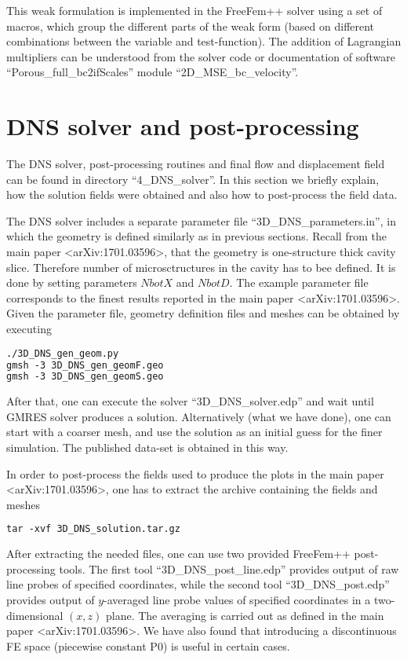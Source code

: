 \documentclass[12pt,a4paper]{article}
\begin{document}
This weak formulation is implemented in the FreeFem++ solver using a set of macros, which group the different parts of the weak form (based on different combinations between the variable and test-function). The addition of Lagrangian multipliers can be understood from the solver code or documentation of software ``Porous\_full\_bc2ifScales'' module ``2D\_MSE\_bc\_velocity''.


\section{DNS solver and post-processing}

The DNS solver, post-processing routines and final flow and displacement field can be found in directory ``4\_DNS\_solver''. In this section we briefly explain, how the solution fields were obtained and also how to post-process the field data.

The DNS solver includes a separate parameter file ``3D\_DNS\_parameters.in'', in which the geometry is defined similarly as in previous sections. Recall from the main paper <arXiv:1701.03596>, that the geometry is one-structure thick cavity slice. Therefore number of microsctructures in the cavity has to bee defined. It is done by setting parameters $NbotX$ and $NbotD$. The example parameter file corresponds to the finest results reported in the main paper <arXiv:1701.03596>. Given the parameter file, geometry definition files and meshes can be obtained by executing
\begin{lstlisting}[language=tex]
./3D_DNS_gen_geom.py
gmsh -3 3D_DNS_gen_geomF.geo
gmsh -3 3D_DNS_gen_geomS.geo
\end{lstlisting}
After that, one can execute the solver ``3D\_DNS\_solver.edp'' and wait until GMRES solver produces a solution. Alternatively (what we have done), one can start with a coarser mesh, and use the solution as an initial guess for the finer simulation. The published data-set is obtained in this way.

In order to post-process the fields used to produce the plots in the main paper <arXiv:1701.03596>, one has to extract the archive containing the fields and meshes
\begin{lstlisting}[language=tex]
tar -xvf 3D_DNS_solution.tar.gz
\end{lstlisting}

After extracting the needed files, one can use two provided FreeFem++ post-processing tools. The first tool ``3D\_DNS\_post\_line.edp'' provides output of raw line probes of specified coordinates, while the second tool ``3D\_DNS\_post.edp'' provides output of $y$-averaged line probe values of specified coordinates in a two-dimensional $(x,z)$ plane. The averaging is carried out as defined in the main paper <arXiv:1701.03596>. We have also found that introducing a discontinuous FE space (piecewise constant P0) is useful in certain cases.
\end{document}
